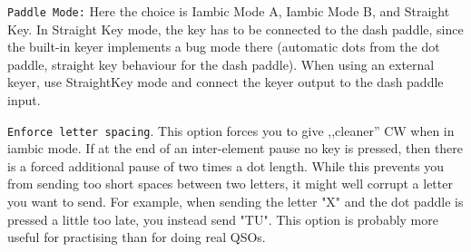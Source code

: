 \documentclass[12pt]{book}
\def\rett#1{\texttt{\color{red}#1}}
\def\pH{pi\-HPSDR\xspace}
\begin{document}
%

\rett{Paddle Mode:} Here the choice is Iambic Mode A, Iambic Mode B,
and  Straight Key. In Straight Key mode, the key has to be connected
to the dash paddle, since the built-in keyer implements a bug mode
there (automatic dots from the dot paddle, straight key behaviour
for the dash paddle). When using an external keyer, use StraightKey
mode and connect the keyer output to the dash paddle input.

\rett{Enforce letter spacing}. This option forces you to give ,,cleaner'' CW
when in iambic mode. If at the end of an inter-element pause no key is
pressed, then there is a forced additional pause of two times a dot length. While this
prevents you from sending too short spaces between two letters, it
might well corrupt a letter you want to send. For example, when sending
the letter "X" and the dot paddle is pressed a little too late, you
instead send "TU". This option is probably more useful for practising than
for doing real QSOs.
\end{document}
